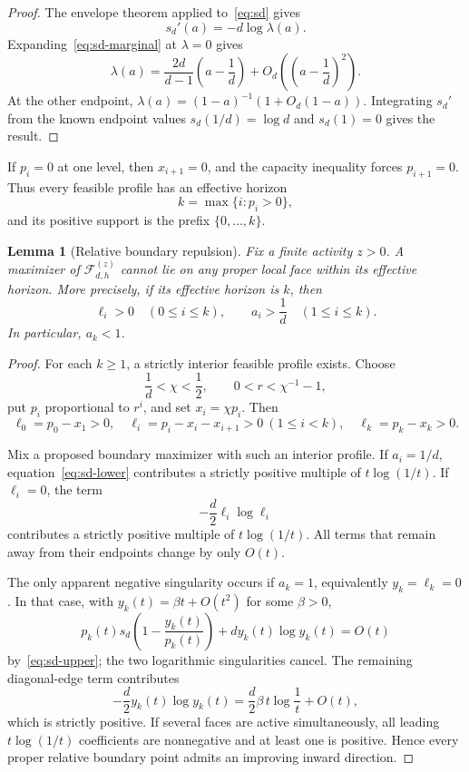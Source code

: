 \documentclass[11pt]{amsart}
\newtheorem{lemma}[theorem]{Lemma}
\theoremstyle{definition}
\newcommand{\Fcal}{\mathcal F}
\begin{document}
\begin{proof}
The envelope theorem applied to~\eqref{eq:sd} gives
\[
 s_d'(a)=-d\log\lambda(a).
\]
Expanding~\eqref{eq:sd-marginal} at $\lambda=0$ gives
\[
 \lambda(a)=\frac{2d}{d-1}
 \left(a-\frac1d\right)
 +O_d\left(\left(a-\frac1d\right)^2\right).
\]
At the other endpoint, $\lambda(a)=(1-a)^{-1}(1+O_d(1-a))$.  Integrating $s_d'$ from the known endpoint values $s_d(1/d)=\log d$ and $s_d(1)=0$ gives the result.
\end{proof}

If $p_i=0$ at one level, then $x_{i+1}=0$, and the capacity inequality forces $p_{i+1}=0$.  Thus every feasible profile has an effective horizon
\[
 k=\max\{i:p_i>0\},
\]
and its positive support is the prefix $\{0,\dots,k\}$.

\begin{lemma}[Relative boundary repulsion]\label{lem:relative-boundary}
Fix a finite activity $z>0$.  A maximizer of $\Fcal_{d,h}^{(z)}$ cannot lie on any proper local face within its effective horizon.  More precisely, if its effective horizon is $k$, then
\[
 \ell_i>0\quad(0\le i\le k),
 \qquad
 a_i>\frac1d\quad(1\le i\le k).
\]
In particular, $a_k<1$.
\end{lemma}

\begin{proof}
For each $k\ge1$, a strictly interior feasible profile exists.  Choose
\[
 \frac1d<\chi<\frac12,
 \qquad
 0<r<\chi^{-1}-1,
\]
put $p_i$ proportional to $r^i$, and set $x_i=\chi p_i$.  Then
\[
 \ell_0=p_0-x_1>0,
 \quad
 \ell_i=p_i-x_i-x_{i+1}>0\ (1\le i<k),
 \quad
 \ell_k=p_k-x_k>0.
\]

Mix a proposed boundary maximizer with such an interior profile.  If $a_i=1/d$, equation~\eqref{eq:sd-lower} contributes a strictly positive multiple of $t\log(1/t)$.  If $\ell_i=0$, the term
\[
 -\frac d2\ell_i\log\ell_i
\]
contributes a strictly positive multiple of $t\log(1/t)$.  All terms that remain away from their endpoints change by only $O(t)$.

The only apparent negative singularity occurs if $a_k=1$, equivalently $y_k=\ell_k=0$.  In that case, with $y_k(t)=\beta t+O(t^2)$ for some $\beta>0$,
\[
 p_k(t)s_d\left(1-\frac{y_k(t)}{p_k(t)}\right)
 +d y_k(t)\log y_k(t)=O(t)
\]
by~\eqref{eq:sd-upper}; the two logarithmic singularities cancel.  The remaining diagonal-edge term contributes
\[
 -\frac d2y_k(t)\log y_k(t)
 =\frac d2\beta\,t\log\frac1t+O(t),
\]
which is strictly positive.  If several faces are active simultaneously, all leading $t\log(1/t)$ coefficients are nonnegative and at least one is positive.  Hence every proper relative boundary point admits an improving inward direction.
\end{proof}
\end{document}
